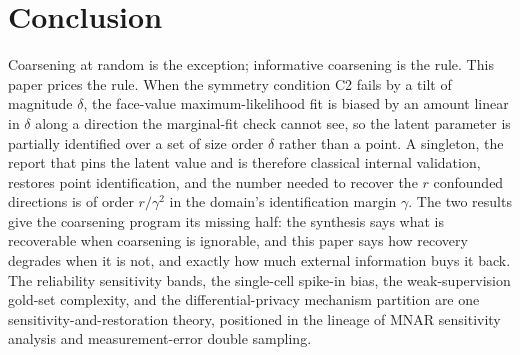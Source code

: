 \section{Conclusion}
\label{sec:conclusion}

Coarsening at random is the exception; informative coarsening is the rule. This
paper prices the rule. When the symmetry condition C2 fails by a tilt of magnitude
$\delta$, the face-value maximum-likelihood fit is biased by an amount linear in
$\delta$ along a direction the marginal-fit check cannot see, so the latent
parameter is partially identified over a set of size order $\delta$ rather than a
point. A
singleton, the report that pins the latent value and is therefore classical
internal validation, restores point identification, and the number needed to
recover the $r$ confounded directions is of order $r/\gamma^2$ in the domain's
identification margin $\gamma$. The two results give the coarsening program its
missing half: the synthesis says what is recoverable when coarsening is ignorable,
and this paper says how recovery degrades when it is not, and exactly how much
external information buys it back. The reliability sensitivity bands, the
single-cell spike-in bias, the weak-supervision gold-set complexity, and the
differential-privacy mechanism partition are one sensitivity-and-restoration theory,
positioned in the lineage of MNAR sensitivity analysis and measurement-error double
sampling.
